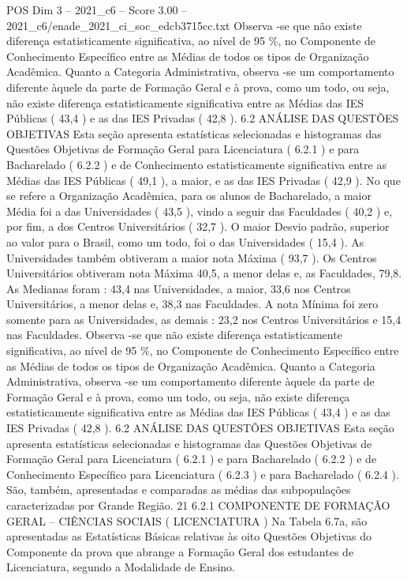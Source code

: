\begin{textsample}{POS Dim 3 – 2021\_c6 – Score 3.00 – 2021\_c6/enade\_2021\_ci\_soc\_edcb3715cc.txt}
Observa -se que não existe diferença estatisticamente significativa, ao nível de 95 \%, no Componente de Conhecimento Específico entre as Médias de todos os tipos de Organização Acadêmica.
Quanto a Categoria Administrativa, observa -se um comportamento diferente àquele da parte de Formação Geral e à prova, como um todo, ou seja, não existe diferença estatisticamente significativa entre as Médias das IES Públicas ( 43,4 ) e as das IES Privadas ( 42,8 ). 6.2 ANÁLISE DAS QUESTÕES OBJETIVAS Esta seção apresenta estatísticas selecionadas e histogramas das Questões Objetivas de Formação Geral para Licenciatura ( 6.2.1 ) e para Bacharelado ( 6.2.2 ) e de Conhecimento estatisticamente significativa entre as Médias das IES Públicas ( 49,1 ), a maior, e as das IES Privadas ( 42,9 ).
No que se refere a Organização Acadêmica, para os alunos de Bacharelado, a maior Média foi a das Universidades ( 43,5 ), vindo a seguir das Faculdades ( 40,2 ) e, por fim, a dos Centros Universitários ( 32,7 ).
O maior Desvio padrão, superior ao valor para o Brasil, como um todo, foi o das Universidades ( 15,4 ).
As Universidades também obtiveram a maior nota Máxima ( 93,7 ).
Os Centros Universitários obtiveram nota Máxima 40,5, a menor delas e, as Faculdades, 79,8.
As Medianas foram : 43,4 nas Universidades, a maior, 33,6 nos Centros Universitários, a menor delas e, 38,3 nas Faculdades.
A nota Mínima foi zero somente para as Universidades, as demais : 23,2 nos Centros Universitários e 15,4 nas Faculdades.
Observa -se que não existe diferença estatisticamente significativa, ao nível de 95 \%, no Componente de Conhecimento Específico entre as Médias de todos os tipos de Organização Acadêmica.
Quanto a Categoria Administrativa, observa -se um comportamento diferente àquele da parte de Formação Geral e à prova, como um todo, ou seja, não existe diferença estatisticamente significativa entre as Médias das IES Públicas ( 43,4 ) e as das IES Privadas ( 42,8 ). 6.2 ANÁLISE DAS QUESTÕES OBJETIVAS Esta seção apresenta estatísticas selecionadas e histogramas das Questões Objetivas de Formação Geral para Licenciatura ( 6.2.1 ) e para Bacharelado ( 6.2.2 ) e de Conhecimento Específico para Licenciatura ( 6.2.3 ) e para Bacharelado ( 6.2.4 ).
São, também, apresentadas e comparadas as médias das subpopulações caracterizadas por Grande Região. 21 6.2.1 COMPONENTE DE FORMAÇÃO GERAL – CIÊNCIAS SOCIAIS ( LICENCIATURA ) Na Tabela 6.7a, são apresentadas as Estatísticas Básicas relativas às oito Questões Objetivas do Componente da prova que abrange a Formação Geral dos estudantes de Licenciatura, segundo a Modalidade de Ensino.

\end{textsample}
